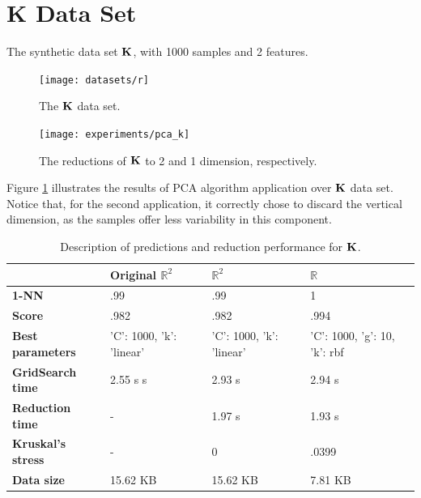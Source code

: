 \section{K Data Set}

The synthetic data set $\mathbf{K}$, with 1000 samples and 2 features.

\begin{figure}[H]
	\centering
	\captionsetup{justification=centering}
	\texttt{[image: datasets/r]}
	\caption{The $\mathbf{K}$ data set.}
\end{figure}

\begin{figure}[H]
	\centering
	\captionsetup{justification=centering}
	
	\texttt{[image: experiments/pca\_k]}
	\caption{The reductions of $\mathbf{K}$ to 2 and 1 dimension, respectively.}
	\label{fig:dsrpca}
\end{figure}

Figure \ref{fig:dsrpca} illustrates the results of PCA algorithm application over $\mathbf{K}$ data set. Notice that, for the second application, it correctly chose to discard the vertical dimension, as the samples offer less variability in this component.

\begin{table}[H]
	\centering
	\begin{tabular}{|p{.25\linewidth}|p{.20\linewidth}|p{.20\linewidth}|p{.20\linewidth}|}
		\hline
		& \textbf{Original $\mathbb{R}^2$} & \textbf{$\mathbb{R}^2$} & \textbf{$\mathbb{R}$} \\\hline
		\textbf{1-NN} & .99 & .99 & 1 \\\hline
		\textbf{Score} & .982 & .982 & .994 \\\hline
		\textbf{Best parameters} & 'C': 1000, 'k': 'linear' & 'C': 1000, 'k': 'linear' & 'C': 1000, 'g': 10, 'k': rbf \\\hline
		\textbf{GridSearch time} & 2.55 s s & 2.93 s & 2.94 s \\\hline
		\textbf{Reduction time} & - & 1.97 s & 1.93 s \\\hline
		\textbf{Kruskal's stress} & - & 0 & .0399 \\\hline
		\textbf{Data size} & 15.62 KB & 15.62 KB & 7.81 KB \\\hline
	\end{tabular}
	\captionsetup{justification=centering}
	\caption{Description of predictions and reduction performance for $\mathbf{K}$.}
\end{table}


